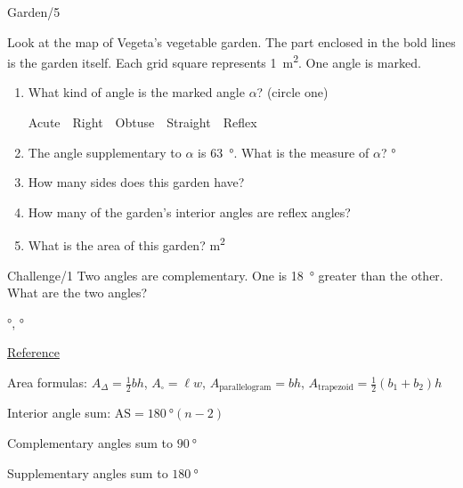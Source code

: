 \documentclass[12pt,letterpaper]{article}
\begin{document}
\begin{problem}{Garden\hfill/5}
  \begin{center}
  \end{center}

 Look at the map of Vegeta's vegetable garden. The part enclosed in the bold
 lines is the garden itself. Each grid square represents \SI{1}{\meter^2}. One
 angle is marked.

 \begin{enumerate}
  \item What kind of angle is the marked angle \(\alpha\)? (circle one)

  \hfill Acute~~Right~~Obtuse~~Straight~~Reflex

  \item The angle supplementary to \(\alpha\) is \SI{63}{\degree}. What is the
  measure of \(\alpha\)?
  \hfill \blankC \si{\degree}

  \item How many sides does this garden have? \hfill \blankC

  \item How many of the garden's interior angles are reflex angles?
  \hfill \blankC

  \item What is the area of this garden? \hfill \blankC \si{\meter^2}
\end{enumerate}

\end{problem}

\begin{problem}{Challenge\hfill/1}
 Two angles are complementary. One is \SI{18}{\degree} greater than the other.
 What are the two angles? \vspace{1ex}

 \hfill \blankC \si{\degree}, \blankC \si{\degree}
\end{problem}

\vspace{1em}\noindent\underline{Reference}

\noindent Area formulas: \(A_\Delta=\frac{1}{2}bh\), \(A_\square=\ell w\),
\(A_\text{parallelogram}=bh\),
\(A_\text{trapezoid}=\frac{1}{2}\left(b_1+b_2\right)h\)

\noindent Interior angle sum: \(\mathrm{AS}=\SI{180}{\degree} (n-2)\)

\noindent Complementary angles sum to \(\SI{90}{\degree}\)

\noindent Supplementary angles sum to \(\SI{180}{\degree}\)
\end{document}
